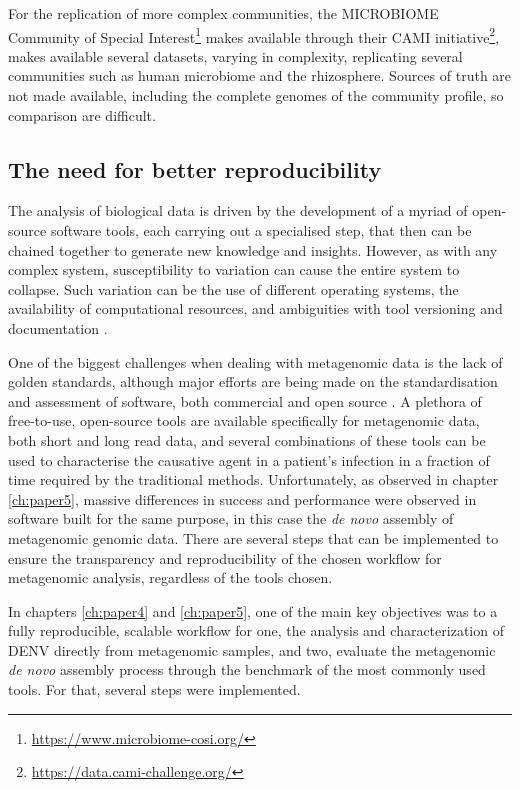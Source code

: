 For the replication of more complex communities, the MICROBIOME Community of Special Interest\footnote{\url{https://www.microbiome-cosi.org/}} makes available through their \ac{CAMI} initiative\footnote{\url{https://data.cami-challenge.org/}}, makes available several datasets, varying in complexity, replicating several communities such as human microbiome and the rhizosphere. Sources of truth are not made available, including the complete genomes of the community profile, so comparison are difficult. 

\subsection{The need for better reproducibility}

The analysis of biological data is driven by the development of a myriad of open-source software tools, each carrying out a specialised step, that then can be chained together to generate new knowledge and insights. However, as with any complex system, susceptibility to variation can cause the entire system to collapse. Such variation can be the use of different operating systems, the availability of computational resources, and ambiguities with tool versioning and documentation \citep{wratten_reproducible_2021}. 

One of the biggest challenges when dealing with metagenomic data is the lack of golden standards, although major efforts are being made on the standardisation and assessment of software, both commercial and open source \citep{angers-loustau_challenges_2018, gruening_recommendations_2019, sczyrba_critical_2017, couto_critical_2018}. A plethora of free-to-use, open-source tools are available specifically for metagenomic data, both short and long read data, and several combinations of these tools can be used to characterise the causative agent in a patient's infection in a fraction of time required by the traditional methods. Unfortunately, as observed in chapter \ref{ch:paper5}, massive differences in success and performance were observed in software built for the same purpose, in this case the \textit{de novo} assembly of metagenomic genomic data. There are several steps that can be implemented to ensure the transparency and reproducibility of the chosen workflow for metagenomic analysis, regardless of the tools chosen. 

In chapters \ref{ch:paper4} and \ref{ch:paper5}, one of the main key objectives was to a fully reproducible, scalable workflow for one, the analysis and characterization of \ac{DENV} directly from metagenomic samples, and two, evaluate the metagenomic \textit{de novo} assembly process through the benchmark of the most commonly used tools. For that, several steps were implemented.

